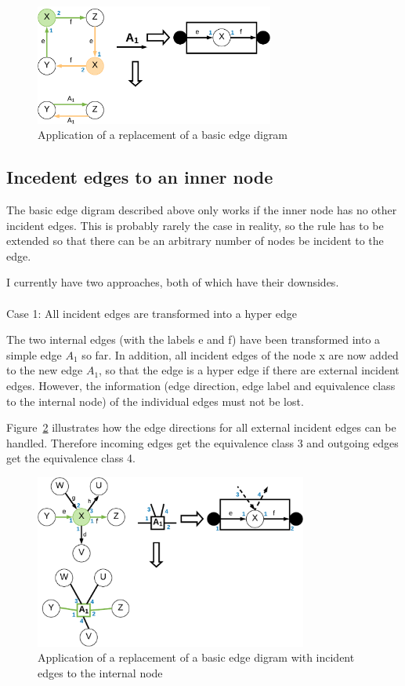 \begin{figure}[h]
	\centering
	\includegraphics[width=0.7\textwidth]{chapters/imgConcept/basicEdgeDigram}
	\caption{Application of a replacement of a basic edge digram}
	\label{fig:basicEdgeDigram}
\end{figure}


\subsection*{Incedent edges to an inner node}
\label{sec:incedentEdges}

The basic edge digram described above only works if the inner node has no other incident edges. This is probably rarely the case in reality, so the rule has to be extended so that there can be an arbitrary number of nodes be incident to the edge.

I currently have two approaches, both of which have their downsides.
\\\\
Case 1: All incident edges are transformed into a hyper edge

The two internal edges (with the labels e and f) have been transformed into a simple edge $A_1$ so far. In addition, all incident edges of the node x are now added to the new edge $A_1$, so that the edge is a hyper edge if there are external incident edges. However, the information (edge direction, edge label and equivalence class to the internal node) of the individual edges must not be lost. 

Figure~\ref{fig:incedentEdges1} illustrates how the edge directions for all external incident edges can be handled. Therefore incoming edges get the equivalence class 3 and outgoing edges get the equivalence class 4. 

\begin{figure}[h]
	\centering
	\includegraphics[width=0.8\textwidth]{chapters/imgConcept/edgeDigram_params}
	\caption{Application of a replacement of a basic edge digram with incident edges to the internal node}
	\label{fig:incedentEdges1}
\end{figure}

